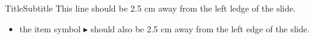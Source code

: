 \documentclass{beamer}
\begin{document}
\begin{frame}{Title}{Subtitle}
This line should be 2.5 cm away from the left ledge of the slide.
\begin{itemize}
\item the item symbol {\color{blue}\small $\blacktriangleright$} should also be 2.5 cm away from the left edge of the slide.
\end{itemize}

\end{frame}
\end{document}
